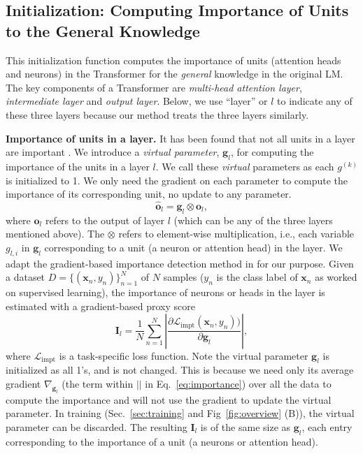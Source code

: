 \documentclass{article} \usepackage{iclr2023_conference,times}
\begin{document}
\subsection{Initialization: Computing Importance of Units to the General Knowledge}
\label{sec:initialization}

This initialization function computes the importance of units (attention heads and neurons) in the Transformer for the \textit{general} knowledge in the original LM. The key components of a Transformer are \textit{multi-head attention layer}, \textit{intermediate layer} and \textit{output layer}. {Below, we use ``layer'' or $l$ to indicate any of these three layers because our method treats the three layers similarly.}






\textbf{Importance of units in a layer.} It has been found that not all units in a layer are important \citep{michel2019sixteen}. We introduce a {\color{black}\textit{virtual parameter}}, $\bm{g}_{l}$, for computing the importance of the units in a layer $l$. {\color{black}We call these \textit{virtual} parameters as each $g^{(k)}$ is initialized to 1. We only need the gradient on each parameter to compute the importance of its corresponding unit, no update to any parameter. }\begin{equation}
\label{eq:gmhatt}
\hat{\bm{o}}_l=\bm{g}_{l} \otimes \bm{o}_l,
\end{equation}
where $\bm{o}_l$ refers to the output of layer $l$ (which can be any of the three layers mentioned above). The $\otimes$ refers to element-wise multiplication, i.e., each variable $g_{l,i}$ in $\bm{g}_l$ corresponding to a unit (a neuron or attention head) in the layer.  We adapt the gradient-based importance detection method in \citep{michel2019sixteen} for our purpose. Given a dataset $D=\{(\bm{x}_n,{y}_n)\}_{n=1}^N$ of $N$ samples  ($y_n$ is the class label of $\bm{x}_n$ as \citep{michel2019sixteen} worked on supervised learning), the importance of neurons or heads in the layer is estimated with a gradient-based proxy score
\begin{equation}
\label{eq:importance}
\bm{I}_{l} = \frac{1}{N}\sum_{n=1}^N|\frac{\partial\mathcal{L}_{\text{impt}}(\bm{x}_n,{y}_n))}{\partial \bm{g}_{l}}|,
\end{equation}
where $\mathcal{L}_{\text{impt}}$ is a task-specific loss function. Note the virtual parameter $\bm{g}_{l}$ is initialized as all 1's, and is not changed. This is because we need only its average gradient $\nabla_{\bm{g}_l}$ (the term within $||$ in Eq.~\ref{eq:importance}) over all the data to compute the importance and will not use the gradient to update the virtual parameter. In training (Sec.~\ref{sec:training} and Fig~\ref{fig:overview} (B)), the virtual parameter can be discarded. {\color{black}The resulting $\bm{I}_{l}$ is of the same size as $\bm{g}_{l}$, each entry corresponding to the importance of a unit (a neurons or attention head).}
\end{document}

